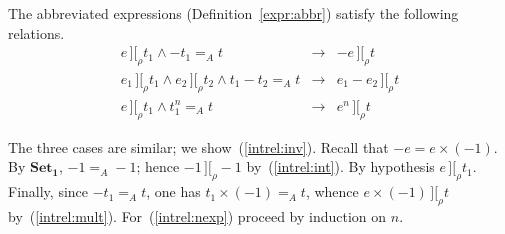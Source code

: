 \documentclass[numreferences]{kluwer}
\newcommand{\intII}{\,]\![}
\newcommand{\intrel}{\mathbin{\intII_{\rho}}}
\newcommand{\axiom}[1]{\ensuremath{\mathbf{#1}}}
\begin{document}
\begin{article}
\begin{lemma}\label{intrel:abbr} The abbreviated expressions
(Definition~\ref{expr:abbr}) satisfy the following relations.
\begin{eqnarray}
\label{intrel:inv}
e\intrel t_1 \wedge -t_1=_A t & \rightarrow & -e\intrel t\\
\label{intrel:minus}
e_1\intrel t_1 \wedge e_2\intrel t_2 \wedge t_1-t_2=_A t
 & \rightarrow & e_1-e_2\intrel t\\
\label{intrel:nexp}
e\intrel t_1 \wedge t_1^n=_A t & \rightarrow & e^n\intrel t
\end{eqnarray}
\end{lemma}
\begin{pf}
The three cases are similar; we show~(\ref{intrel:inv}).
Recall that $-e=e\times(-1)$.  By \axiom{Set_1}, $-1=_A -1$;
hence $-1\intrel -1$ by~(\ref{intrel:int}).  By hypothesis $e\intrel
t_1$.  Finally, since $-t_1=_A t$, one has $t_1\times(-1)=_A t$, whence
$e\times(-1)\intrel t$ by~(\ref{intrel:mult}).
For~(\ref{intrel:nexp}) proceed by induction on $n$.
\end{pf}



\end{article}
\end{document}
